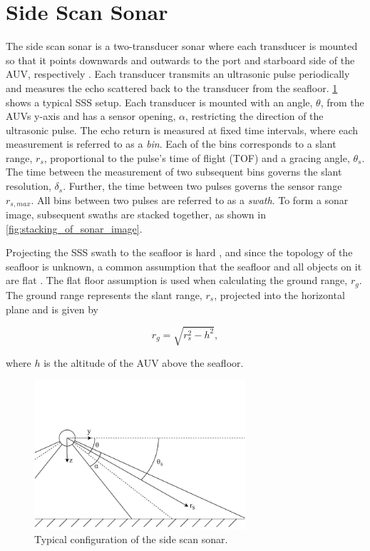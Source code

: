 \section{Side Scan Sonar}

The side scan sonar is a two-transducer sonar where each transducer is mounted so that it points downwards and outwards to the port and starboard side of the AUV, respectively \cite{Burguera2016High-ResolutionSonar}. Each transducer transmits an ultrasonic pulse periodically and measures the echo scattered back to the transducer from the seafloor. \cref{fig:sss} shows a typical SSS setup. Each transducer is mounted with an angle, $\theta$, from the AUVs y-axis and has a sensor opening, $\alpha$, restricting the direction of the ultrasonic pulse. The echo return is measured at fixed time intervals, where each measurement is referred to as a \textit{bin}. Each of the bins corresponds to a slant range, $r_s$, proportional to the pulse's time of flight (TOF) and a gracing angle, $\theta_s$. The time between the measurement of two subsequent bins governs the slant resolution, $\delta_s$. Further, the time between two pulses governs the sensor range $r_{s, max}$. All bins between two pulses are referred to as a \textit{swath}. To form a sonar image, subsequent swaths are stacked together, as shown in \cref{fig:stacking_of_sonar_image}. 

Projecting the SSS swath to the seafloor is hard \cite{Coiras2007MultiresolutionImages}, and since the topology of the seafloor is unknown, a common assumption that the seafloor and all objects on it are flat \cite{Burguera2016High-ResolutionSonar}. The flat floor assumption is used when calculating the ground range, $r_g$. The ground range represents the slant range, $r_s$, projected into the horizontal plane and is given by

\begin{equation}
    r_g = \sqrt{r_s^2 - h^2},
    \label{eq:ground_range}
\end{equation}

where $h$ is the altitude of the AUV above the seafloor.

\hspace{1cm}

\begin{figure}[h]
    \centering
    \includegraphics[trim=0cm 0cm 0cm 3.1cm, clip=true, width=0.7\textwidth]{figures/sss.drawio.pdf}
    \caption{Typical configuration of the side scan sonar.}
    \label{fig:sss}
\end{figure}

